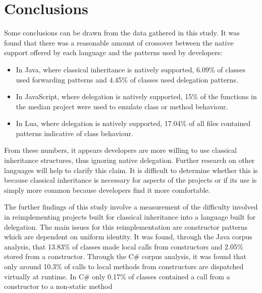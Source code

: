 \chapter{Conclusions}\label{C:con}
Some conclusions can be drawn from the data gathered in this study. It was found that there was a reasonable amount of crossover between the native support offered by each language and the patterns used by developers:
\begin{itemize}
	\item In Java, where classical inheritance is natively supported, 6.09\% of classes used forwarding patterns and 4.45\% of classes used delegation patterns.
	\item In JavaScript, where delegation is natively supported, 15\% of the functions in the median project were used to emulate class or method behaviour.
	\item In Lua, where delegation is natively supported, 17.04\% of all files contained patterns indicative of class behaviour.
\end{itemize}
From these numbers, it appears developers are more willing to use classical inheritance structures, thus ignoring native delegation. Further research on other languages will help to clarify this claim. It is difficult to determine whether this is because classical inheritance is necessary for aspects of the projects or if its use is simply more common because developers find it more comfortable.
\newline

The further findings of this study involve a measurement of the difficulty involved in reimplementing projects built for classical inheritance into a language built for delegation. The main issues for this reimplementation are constructor patterns which are dependent on uniform identity. It was found, through the Java corpus analysis, that 13.83\% of classes made local calls from constructors and 2.05\% stored  from a constructor. Through the C\# corpus analysis, it was found that only around 10.3\% of calls to local methods from constructors are dispatched virtually at runtime. In C\# only 0.17\% of classes contained a call from a constructor to a non-static method